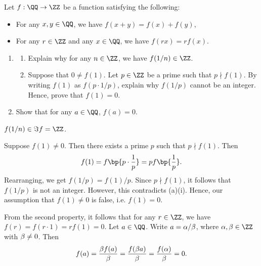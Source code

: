 \begin{problem}
    Let $f : \QQ \to \ZZ$ be a function satisfying the following:

    \begin{itemize}
        \item For any $x, y \in \QQ$, we have $f(x + y) = f(x) + f(y)$,
        \item For any $r \in \ZZ$ and any $x \in \QQ$, we have $f(rx) = rf(x)$.
    \end{itemize}

    \begin{enumerate}
        \item \begin{enumerate}
            \item Explain why for any $n \in \ZZ$, we have $f(1/n) \in \ZZ$.
            \item Suppose that $0 \neq f(1)$. Let $p \in \ZZ$ be a prime such that $p \nmid f(1)$. By writing $f(1)$ as $f(p \cdot 1/p)$, explain why $f(1/p)$ cannot be an integer. Hence, prove that $f(1) = 0$.
        \end{enumerate}
        \item Show that for any $a \in \QQ$, $f(a) = 0$.
    \end{enumerate}
\end{problem}
\begin{solution}
    \begin{ppart}
        \begin{psubpart}
            $f(1/n) \in \Im f = \ZZ$.
        \end{psubpart}
        \begin{psubpart}
            Suppose $f(1) \neq 0$. Then there exists a prime $p$ such that $p \nmid f(1)$. Then \[f(1) = f\bp{p \cdot \frac1p} = p f\bp{\frac1p}.\] Rearranging, we get $f(1/p) = f(1)/p$. Since $p \nmid f(1)$, it follows that $f(1/p)$ is not an integer. However, this contradicts (a)(i). Hence, our assumption that $f(1) \neq 0$ is false, i.e. $f(1) = 0$.
        \end{psubpart}
    \end{ppart}
    \begin{ppart}
        From the second property, it follows that for any $r \in \ZZ$, we have $f(r) = f(r \cdot 1) = r f(1) = 0$. Let $a \in \QQ$. Write $a = \alpha/\beta$, where $\a, \b \in \ZZ$ with $\beta \neq 0$. Then \[f(a) = \frac{\beta f(a)}{\beta} = \frac{f(\beta a)}{\beta} = \frac{f(\alpha)}{\beta}  = 0.\]
    \end{ppart}
\end{solution}

